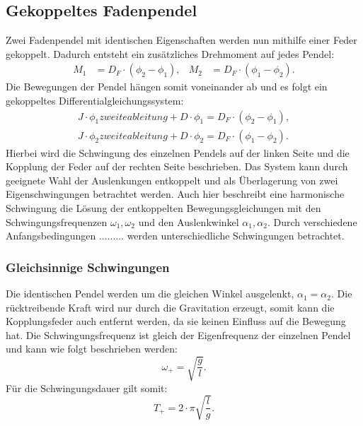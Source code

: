 \subsection{Gekoppeltes Fadenpendel}
Zwei Fadenpendel mit identischen Eigenschaften werden nun mithilfe einer Feder gekoppelt.
Dadurch entsteht ein zusätzliches Drehmoment auf jedes Pendel:
\begin{align*}
    M_1 &= D_F \cdot (\phi_2 -\phi_1),   &M_2 &= D_F \cdot (\phi_1 - \phi_2).
\end{align*}
Die Bewegungen der Pendel hängen somit voneinander ab und es folgt ein gekoppeltes Differentialgleichungssystem:
\begin{align*}
    J \cdot \phi_1 zweite ableitung + D \cdot \phi_1 = D_F \cdot (\phi_2 -\phi_1), \\
    J \cdot \phi_2 zweite ableitung + D \cdot \phi_2 = D_F \cdot (\phi_1 -\phi_2).   
\end{align*}
Hierbei wird die Schwingung des einzelnen Pendels auf der linken Seite und die Kopplung der Feder auf der rechten Seite beschrieben.
Das System kann durch geeignete Wahl der Auslenkungen entkoppelt und als Überlagerung von zwei Eigenschwingungen betrachtet werden.
Auch hier beschreibt eine harmonische Schwingung die Lösung der entkoppelten Bewegungsgleichungen mit den Schwingungsfrequenzen $\omega_1, \omega_2$
und den Auslenkwinkel $\alpha_1 , \alpha_2$.
Durch verschiedene Anfangsbedingungen ......... werden unterschiedliche Schwingungen betrachtet.

\subsubsection{Gleichsinnige Schwingungen}
Die identischen Pendel werden um die gleichen Winkel ausgelenkt, $\alpha_1 = \alpha_2$.
Die rücktreibende Kraft wird nur durch die Gravitation erzeugt, somit kann die Kopplungsfeder auch entfernt werden, da sie keinen Einfluss auf die Bewegung hat.
Die Schwingungsfrequenz ist gleich der Eigenfrequenz der einzelnen Pendel und kann wie folgt beschrieben werden:
\begin{equation*}
    \omega_+ = \sqrt{\frac{g}{l}}.
\end{equation*}
Für die Schwingungsdauer gilt somit:
\begin{equation} \label{eqn:Tplus}
    T_+ = 2 \cdot \pi \sqrt{\frac{l}{g}}.
\end{equation}

